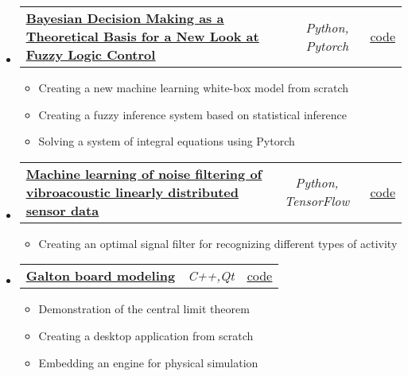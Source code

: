 \documentclass[a4paper,11pt]{article}
\makeatletter
\newcommand{\resumeItem}[1]{
  \item\small{#1}
}
\newcommand{\resumeItemListStart}{\begin{itemize}[rightmargin=0.11in]}
\newcommand{\resumeItemListEnd}{\end{itemize}}
\newcommand{\resumeTrioHeading}[3]{
  \item\small{
    \begin{tabular*}{0.96\textwidth}[t]{
      l@{\extracolsep{\fill}}c@{\extracolsep{\fill}}r
    }
      \textbf{#1} & \textit{#2} & #3
    \end{tabular*}
  }
}
\newcommand{\resumeHeadingListStart}{
  \begin{itemize}[leftmargin=0.15in, label={}]
}
\newcommand{\resumeHeadingListEnd}{\end{itemize}}
\makeatother
\begin{document}
  
  \resumeHeadingListStart{}
    \resumeTrioHeading{\href{https://drive.google.com/drive/u/0/folders/1zftI7n1gPzwnwDx0ypsb0sOc0G7IpfPW}{\uline{Bayesian Decision Making as a Theoretical Basis for a New Look at Fuzzy Logic Control}}}{Python, Pytorch}{\href{https://github.com/RepnikovPavel/statistical_decision_making}{\uline{\faGithubSquare code}}}
        \resumeItemListStart{}
        \resumeItem{Creating a new machine learning white-box model from scratch}
        \resumeItem{Creating a fuzzy inference system based on statistical inference}
        \resumeItem{Solving a system of integral equations using Pytorch}
        \resumeItemListEnd{}
\resumeHeadingListEnd

\resumeHeadingListStart{}
    \resumeTrioHeading{\href{https://drive.google.com/drive/u/0/folders/1q2EaWoaNGiwG4w1tQbm2k_c_2cM4j4Uv}{\uline{Machine learning of noise filtering of vibroacoustic linearly distributed sensor data}}}{Python, TensorFlow}{\href{https://github.com/RepnikovPavel/kursach_filtr_of_signal}{\uline{\faGithubSquare code}}}
        \resumeItemListStart{}
          \resumeItem{Creating an optimal signal filter for recognizing different types of activity}
        \resumeItemListEnd{}
    \resumeHeadingListEnd


\resumeHeadingListStart{}
    \resumeTrioHeading{\href{https://youtu.be/vKb5lqeu0dQ?si=cGm2u1DfZwwj2dD5}{\uline{\faIcon{youtube} Galton board modeling}}}{C++,Qt}{\href{https://github.com/RepnikovPavel/Galtons-desk-with-box2d-and-qt-on-cpp}{\uline{\faGithubSquare code}}}
        \resumeItemListStart{}
          \resumeItem{Demonstration of the central limit theorem}
          \resumeItem{Creating a desktop application from scratch}
          \resumeItem{Embedding an engine for physical simulation}
        \resumeItemListEnd{}
    \resumeHeadingListEnd





\end{document}
